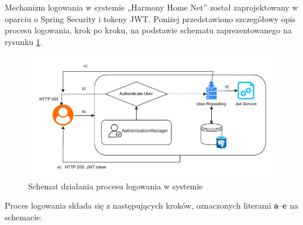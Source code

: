 Mechanizm logowania w systemie „Harmony Home Net” został zaprojektowany w oparciu o Spring Security i tokeny JWT. Poniżej przedstawiono szczegółowy opis procesu logowania, krok po kroku, na podstawie schematu zaprezentowanego na rysunku \ref{fig:ebok_db_concept}.

\begin{figure}[ht]
    \centering
    \includegraphics[width=.9\linewidth]{rys03/proces_logowania}
    \caption{Schemat działania procesu logowania w systemie~\cite{JWToauth}}
    \label{fig:ebok_db_concept}
\end{figure}

Proces logowania składa się z następujących kroków, oznaczonych literami \textbf{a}–\textbf{e} na schemacie:

